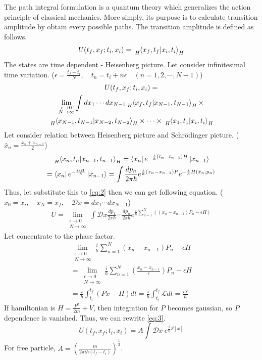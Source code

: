 \documentclass[%
 reprint,
 amsmath,amssymb,
 aps,
]{revtex4-1}
\begin{document}
The path integral formulation is a quantum theory which generalizes the action principle of classical mechanics. More simply, its purpose is to calculate transition amplitude by obtain every possible paths. The transition amplitude is defined as follows.
\begin{equation}\label{eq:1}
U(t_f, x_f ; t_i, x_i)= \tensor[_H]{\braket{x_f, t_f | x_i, t_i}}{_H}
\end{equation}
The states are time dependent - Heisenberg picture. Let consider infinitesimal time variation.
(\(\epsilon=\frac{t_f-t_i}{N}, \quad t_n=t_i+n\epsilon \quad (n=1,2,\cdots,N-1)\))
\begin{multline}\label{eq:2}
U(t_f, x_f ; t_i, x_i) = \\\lim_{\substack{\epsilon \to 0 \\ N \to \infty}}\int dx_1 \cdots dx_{N-1} \tensor[_H]{\braket{x_f,t_f|x_{N-1},t_{N-1}}}{_H}\times \\ \tensor[_H]{\braket{x_{N-1},t_{N-1}|x_{N-2},t_{N-2}}}{_H}\times \cdots \times \tensor[_H]{\braket{x_1,t_1|x_i,t_i}}{_H}\\
\end{multline}
Let consider relation between Heisenberg picture and Schr{\"o}dinger picture. (\(\bar{x}_n = \frac{x_n+x_{n-1}}{2}\))
\begin{multline*}
\tensor[_H]{\braket{x_n,t_n|x_{n-1},t_{n-1}}}{_H}=\bra{x_n}e^{-\frac{i}{\hbar}(t_n-t_{n-1})H}\ket{x_{n-1}}
\\=\bra{x_n}e^{-\frac{i\epsilon H}{\hbar}}\ket{x_{n-1}}=\int \frac{dp_n}{2\pi\hbar}e^{\frac{i}{\hbar}(x_n-x_{n-1})P}e^{-\frac{i}{\hbar}H(\bar{x}_n,p_n)}
\end{multline*}
Thus, let substitute this to \eqref{eq:2} then we can get following equation. (\(x_0=x_i, \quad x_N=x_f, \quad \mathcal{D}x=dx_1 \cdots dx_{N-1}\))
\begin{multline}\label{eq:3}
U=\lim_{\substack{\epsilon \to 0 \\ N \to \infty}}\int \mathcal{D}x\frac{dp_1}{2\pi\hbar}\cdots\frac{dp_n}{2\pi\hbar}
e^{\frac{i}{\hbar}\sum_{n=1}^{N}((x_n-x_{n-1})P_n-\epsilon H)}
\end{multline}
Let concentrate to the phase factor.
\begin{multline}\label{eq:4}
\lim_{\substack{\epsilon \to 0 \\ N \to \infty}}\frac{i}{\hbar}\sum_{n=1}^{N}(x_n-x_{n-1})P_n-\epsilon H\\=\lim_{\substack{\epsilon \to 0 \\ N \to \infty}}\frac{i}{\hbar}\sum_{n=1}^{N}(\frac{x_n-x_{n-1}}{\epsilon})P_n-\epsilon H\\=\frac{i}{\hbar}\int_{t_i}^{t_f}(P\dot{x}-H)dt = \frac{i}{\hbar}\int_{t_i}^{t_f}\mathcal{L}dt=\frac{i\mathcal{S}}{\hbar}
\end{multline}
If hamiltonian is \(H=\frac{P^2}{2m}+V\), then integration for $P$ becomes gaussian, so $P$ dependence is vanished. Thus, we can rewrite \eqref{eq:3}.
\begin{equation}\label{eq:5}
U(t_f,x_f;t_i,x_i)=A\int \mathcal{D}x\ e^{\frac{i}{\hbar}\mathcal{S}[x]}
\end{equation}
For free particle, \(A = (\frac{m}{2\pi i\hbar (t_f-t_i)})^{\frac{1}{2}}\).
\end{document}
